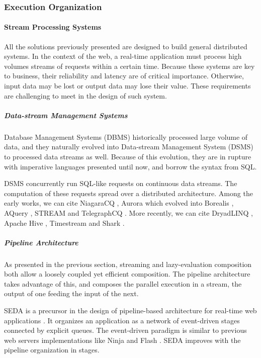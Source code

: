 \subsubsection{Execution Organization}


\paragraph{Stream Processing Systems}

All the solutions previously presented are designed to build general distributed systems.
In the context of the web, a real-time application must process high volumes streams of requests within a certain time.
Because these systems are key to business, their reliability and latency are of critical importance.
Otherwise, input data may be lost or output data may lose their value.
These requirements are challenging to meet in the design of such system.

\subparagraph{Data-stream Management Systems}

Database Management Systems (DBMS) historically processed large volume of data, and they naturally evolved into Data-stream Management System (DSMS) to processed data streams as well.
Because of this evolution, they are in rupture with imperative languages presented until now, and borrow the syntax from SQL.

DSMS concurrently run SQL-like requests on continuous data streams.
The computation of these requests spread over a distributed architecture.
Among the early works, we can cite
NiagaraCQ \cite{Chen2000,Naughton2001},
Aurora \cite{Abadi2003,Abadi2003a,Balakrishnan2004} which evolved into
Borealis \cite{Abadi2005},
AQuery \cite{Lerner2003},
STREAM \cite{Arasu2003,Arasu2005} and
TelegraphCQ \cite{Krishnamurthy2003,Chandrasekaran2003}.
More recently, we can cite
DryadLINQ \cite{Isard2007,Yu2009},
Apache Hive \cite{Thusoo2009},
Timestream \cite{Qian2013} and
Shark \cite{Xin2013}.


\subparagraph{Pipeline Architecture}

As presented in the previous section, streaming and lazy-evaluation composition both allow a loosely coupled yet efficient composition.
The pipeline architecture takes advantage of this, and composes the parallel execution in a stream, the output of one feeding the input of the next.

SEDA is a precursor in the design of pipeline-based architecture for real-time web applications \cite{Welsh2001}.
It organizes an application as a network of event-driven stages connected by explicit queues.
The event-driven paradigm is similar to previous web servers implementations like Ninja and Flash \cite{Gribble2001,Pai1999}.
SEDA improves with the pipeline organization in stages.

